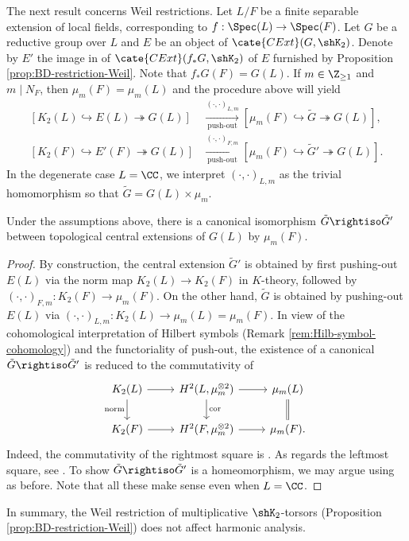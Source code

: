 \documentclass[a4paper,10pt]{article}
\begin{document}
The next result concerns Weil restrictions. Let $L/F$ be a finite separable extension of local fields, corresponding to $f: \Spec(L) \to \Spec(F)$. Let $G$ be a reductive group over $L$ and $E$ be an object of $\cate{CExt}(G,\shK_2)$. Denote by $E'$ the image in of $\cate{CExt}(f_* G, \shK_2)$ of $E$ furnished by Proposition \ref{prop:BD-restriction-Weil}. Note that $f_* G(F) = G(L)$. If $m \in \Z_{\geq 1}$ and $m \mid N_F$, then $\mu_m(F) = \mu_m(L)$ and the procedure above will yield
\begin{align*}
	\left[ K_2(L) \hookrightarrow E(L) \twoheadrightarrow G(L) \right] & \xrightarrow[\text{push-out}]{(\cdot, \cdot)_{L,m}} \left[ \mu_m(F) \hookrightarrow \tilde{G} \twoheadrightarrow G(L) \right], \\
	\left[ K_2(F) \hookrightarrow E'(F) \twoheadrightarrow G(L) \right] & \xrightarrow[\text{push-out}]{(\cdot, \cdot)_{F,m}} \left[ \mu_m(F) \hookrightarrow \tilde{G}' \twoheadrightarrow G(L) \right].
\end{align*}
In the degenerate case $L=\CC$, we interpret $(\cdot, \cdot)_{L,m}$ as the trivial homomorphism so that $\tilde{G} = G(L) \times \mu_m$.

\begin{proposition}\label{prop:restriction-commutes}
	Under the assumptions above, there is a canonical isomorphism $\tilde{G} \rightiso \tilde{G}'$ between topological central extensions of $G(L)$ by $\mu_m(F)$.
\end{proposition}
\begin{proof}
	By construction, the central extension $\tilde{G}'$ is obtained by first pushing-out $E(L)$ via the norm map $K_2(L) \to K_2(F)$ in $K$-theory, followed by $(\cdot, \cdot)_{F,m}: K_2(F) \to \mu_m(F)$. On the other hand, $\tilde{G}$ is obtained by pushing-out $E(L)$ via $(\cdot, \cdot)_{L,m}: K_2(L) \to \mu_m(L) = \mu_m(F)$. In view of the cohomological interpretation of Hilbert symbols (Remark \ref{rem:Hilb-symbol-cohomology}) and the functoriality of push-out, the existence of a canonical $\tilde{G} \rightiso \tilde{G}'$ is reduced to the commutativity of
	\[\begin{tikzcd}
		K_2(L) \arrow{d}[swap]{\text{norm}} \arrow{r} & H^2(L, \mu_m^{\otimes 2}) \arrow{d}{\text{cor}} \arrow{r} & \mu_m(L) \arrow[-, double equal sign distance]{d} \\
		K_2(F) \arrow{r} & H^2(F, \mu_m^{\otimes 2}) \arrow{r} & \mu_m(F).
	\end{tikzcd}\]
	Indeed, the commutativity of the rightmost square is \cite[Proposition 5.5]{D96}. As regards the leftmost square, see \cite[Lemma 18.2]{Sus85}. To show $\tilde{G} \rightiso \tilde{G}'$ is a homeomorphism, we may argue using \cite[Lemma 10.2]{BD01} as before. Note that all these make sense even when $L=\CC$.
\end{proof}
In summary, the Weil restriction of multiplicative $\shK_2$-torsors (Proposition \ref{prop:BD-restriction-Weil}) does not affect harmonic analysis. 
\end{document}
